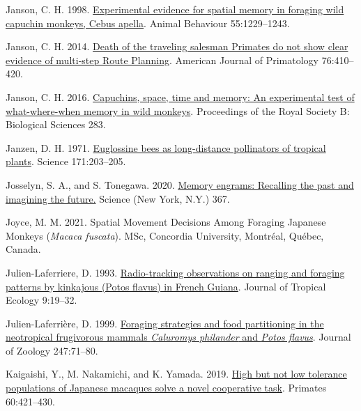 \documentclass[twoside,12pt,final]{ucthesis-CA2012}
\newenvironment{CSLReferences}%
  {}%
  {\par}
\begin{document}
\begin{ucmainmatter}
\begin{CSLReferences}{1}{0}
\leavevmode{}%
Janson, C. H. 1998. \href{https://doi.org/10.1006/anbe.1997.0688}{Experimental evidence for spatial memory in foraging wild capuchin monkeys, Cebus apella}. Animal Behaviour 55:1229--1243.

\leavevmode{}%
Janson, C. H. 2014. \href{https://doi.org/10.1002/ajp.22186}{Death of the traveling salesman Primates do not show clear evidence of multi‐step Route Planning}. American Journal of Primatology 76:410--420.

\leavevmode{}%
Janson, C. H. 2016. \href{https://doi.org/10.1098/rspb.2016.1432}{Capuchins, space, time and memory: An experimental test of what-where-when memory in wild monkeys}. Proceedings of the Royal Society B: Biological Sciences 283.

\leavevmode{}%
Janzen, D. H. 1971. \href{https://doi.org/10.1126/science.171.3967.203}{Euglossine bees as long-distance pollinators of tropical plants}. Science 171:203--205.

\leavevmode{}%
Josselyn, S. A., and S. Tonegawa. 2020. \href{https://doi.org/10.1126/science.aaw4325}{Memory engrams: Recalling the past and imagining the future.} Science (New York, N.Y.) 367.

\leavevmode{}%
Joyce, M. M. 2021. Spatial Movement Decisions Among Foraging Japanese Monkeys (\emph{Macaca fuscata}). MSc, Concordia University, Montréal, Québec, Canada.

\leavevmode{}%
Julien-Laferriere, D. 1993. \href{https://doi.org/10.1017/S0266467400006908}{Radio-tracking observations on ranging and foraging patterns by kinkajous (Potos flavus) in French Guiana}. Journal of Tropical Ecology 9:19--32.

\leavevmode{}%
Julien-Laferrière, D. 1999. \href{https://doi.org/10.1017/S0952836999001077}{Foraging strategies and food partitioning in the neotropical frugivorous mammals \emph{Caluromys philander} and \emph{Potos flavus}}. Journal of Zoology 247:71--80.

\leavevmode{}%
Kaigaishi, Y., M. Nakamichi, and K. Yamada. 2019. \href{https://doi.org/10.1007/s10329-019-00742-z}{High but not low tolerance populations of Japanese macaques solve a novel cooperative task}. Primates 60:421--430.


\end{CSLReferences}
\end{ucmainmatter}
\end{document}
